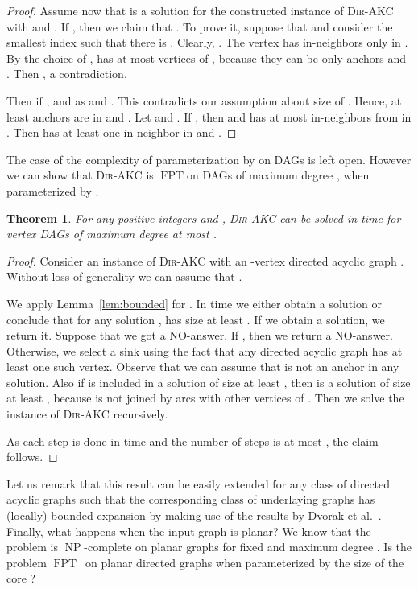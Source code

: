 \documentclass[11pt,a4paper]{article}
\newtheorem{theorem}{Theorem}
\DeclareMathOperator{\operatorClassNP}{NP}
\newcommand{\classNP}{\ensuremath{\operatorClassNP}}
\DeclareMathOperator{\operatorClassFPT}{FPT}
\newcommand{\classFPT}{\ensuremath{\operatorClassFPT}}
\newcommand{\DAKC}{\textsc{Dir-AKC}\xspace}
\begin{document}
\begin{proof}
Assume now that  is a solution for the constructed instance of \DAKC with  and . If
, then we claim that . To prove it, suppose that  and consider the smallest index  such that there is . Clearly, .
The vertex  has in-neighbors only in . By the choice of ,  has at most  vertices of , because
they can be only anchors and . Then , a contradiction.

Then if ,  and  as  and . This
contradicts our assumption about size of . Hence, at least  anchors are in  and . Let
 and . If , then  and  has at most  in-neighbors
from  in . Then  has at least one in-neighbor in  and .
\end{proof}


The case of  the complexity of parameterization by  on DAGs is left open. However we can show that
\DAKC is \classFPT on DAGs of maximum degree , when parameterized by .

\begin{theorem}\label{thm:dags}
For any positive integers  and , \DAKC can be solved in time  for
-vertex DAGs of maximum degree at most .
\end{theorem}

\begin{proof}
Consider an instance of \DAKC with an -vertex directed acyclic graph . Without loss of generality we can assume that
.

We apply Lemma~\ref{lem:bounded} for . In time  we either obtain a solution or conclude
that for any solution ,  has size at least . If we obtain a solution, we return it. Suppose that we got a
NO-answer. If , then we return a NO-answer. Otherwise,  we select a sink  using the fact that any directed
acyclic graph has at least one such vertex. Observe that we can assume that  is not an anchor in any solution. Also if 
is included in a solution  of size at least , then  is a solution of size at least , because  is not joined
by arcs with other vertices of . Then we solve the instance  of \DAKC recursively.

As each step is done in time  and the number of steps is at most , the claim follows.
\end{proof}

Let us remark that this result can be easily extended for any class of directed acyclic graphs  such that the
corresponding class of underlaying graphs  has (locally) bounded expansion by making use of  the
results by Dvorak et al.~\cite{DvorakKT10}.
Finally, what happens when the input graph is planar? We know that the problem is \classNP-complete on planar graphs for fixed
 and maximum degree . Is the problem \classFPT\ on planar directed graphs when parameterized by the size of the
core ?
\end{document}
